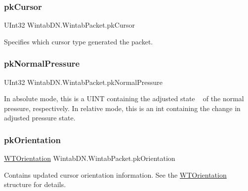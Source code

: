 \subsubsection{\texorpdfstring{pk\+Cursor}{pkCursor}}
{\footnotesize\ttfamily U\+Int32 Wintab\+D\+N.\+Wintab\+Packet.\+pk\+Cursor}



Specifies which cursor type generated the packet. 

\mbox{\label{struct_wintab_d_n_1_1_wintab_packet_a5fdd43fd4c829d000ed88a12717f1684}} 
\subsubsection{\texorpdfstring{pk\+Normal\+Pressure}{pkNormalPressure}}
{\footnotesize\ttfamily U\+Int32 Wintab\+D\+N.\+Wintab\+Packet.\+pk\+Normal\+Pressure}



In absolute mode, this is a U\+I\+NT containing the adjusted state ~\newline
of the normal pressure, respectively. In relative mode, this is an int containing the change in adjusted pressure state. 

\mbox{\label{struct_wintab_d_n_1_1_wintab_packet_a78aa4c64fed2484fd43e079dde7a4aaf}} 
\subsubsection{\texorpdfstring{pk\+Orientation}{pkOrientation}}
{\footnotesize\ttfamily \mbox{\hyperlink{struct_wintab_d_n_1_1_w_t_orientation}{W\+T\+Orientation}} Wintab\+D\+N.\+Wintab\+Packet.\+pk\+Orientation}



Contains updated cursor orientation information. See the \mbox{\hyperlink{struct_wintab_d_n_1_1_w_t_orientation}{W\+T\+Orientation}} structure for details. 

